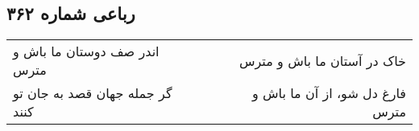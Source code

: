 \begin{center}
\section*{رباعی شماره ۳۶۲}
\label{sec:sh362}
\begin{longtable}{l p{0.5cm} r}
اندر صف دوستان ما باش و مترس
&&
خاک در آستان ما باش و مترس
\\
گر جمله جهان قصد به جان تو کنند
&&
فارغ دل شو، از آن ما باش و مترس
\\
\end{longtable}
\end{center}
